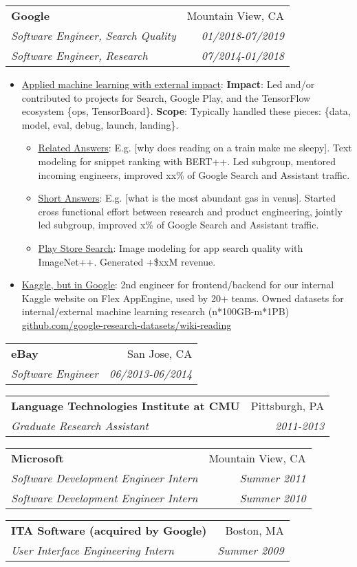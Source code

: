 \documentclass[letterpaper,9pt]{article}
\makeatletter
\newcommand{\resumeItem}[2]{
    \item\small{
        \underline{#1}{: #2 \vspace{-2pt}}
    }
}
\newcommand{\resumeSubheading}[4]{
    \vspace{-1pt}\item
    \begin{tabular*}{0.97\textwidth}[t]{l@{\extracolsep{\fill}}r}
        \textbf{#1} & #2 \\
        \textit{\small#3} & \textit{\small #4} \\
    \end{tabular*}\vspace{-5pt}
}
\newcommand{\resumeDoubleSubheading}[6]{
    \vspace{-1pt}\item
    \begin{tabular*}{0.97\textwidth}[t]{l@{\extracolsep{\fill}}r}
        \textbf{#1} & #2 \\
        \textit{\small#3} & \textit{\small #4} \\
        \textit{\small#5} & \textit{\small #6} \\
    \end{tabular*}\vspace{-5pt}
}
\newcommand{\resumeItemListStart}{\begin{itemize}}
\newcommand{\resumeItemListEnd}{\end{itemize}\vspace{-5pt}}
\makeatother
\begin{document}
    \resumeDoubleSubheading
      {Google}{Mountain View, CA}
      {Software Engineer, Search Quality}{01/2018-07/2019}
      {Software Engineer, Research}{07/2014-01/2018}
      \resumeItemListStart
        \resumeItem{Applied machine learning with external impact}
          {
              \newline \textbf{Impact}: Led and/or contributed to projects for Search, Google Play, and the TensorFlow ecosystem \{ops, TensorBoard\}.
              \newline \textbf{Scope}: Typically handled these pieces: \{data, model, eval, debug, launch, landing\}.
          }
          \resumeItemListStart
            \resumeItem{Related Answers}{E.g. [why does reading on a train make me sleepy]. Text modeling for snippet ranking with BERT++. Led subgroup, mentored incoming engineers, improved xx\% of Google Search and Assistant traffic.}
            \resumeItem{Short Answers}{E.g. [what is the most abundant gas in venus]. Started cross functional effort between research and product engineering, jointly led subgroup, improved x\% of Google Search and Assistant traffic.}
            \resumeItem{Play Store Search}{Image modeling for app search quality with ImageNet++. Generated +\$xxM revenue.}
          \resumeItemListEnd
          \vspace{4pt}
        \resumeItem{Kaggle, but in Google}
          {
              \newline 2nd engineer for frontend/backend for our internal Kaggle website on Flex AppEngine, used by 20+ teams.
              \newline Owned datasets for internal/external machine learning research (n*100GB-m*1PB)
              \href{https://github.com/google-research-datasets/wiki-reading}{github.com/google-research-datasets/wiki-reading}
          }
      \resumeItemListEnd

    \resumeSubheading
      {eBay}{San Jose, CA}
      {Software Engineer}{06/2013-06/2014}
      
    \resumeSubheading
      {Language Technologies Institute at CMU}{Pittsburgh, PA}
      {Graduate Research Assistant}{2011-2013}
      
    \resumeDoubleSubheading
      {Microsoft}{Mountain View, CA}
      {Software Development Engineer Intern}{Summer 2011}
      {Software Development Engineer Intern}{Summer 2010}
      
    \resumeSubheading
      {ITA Software (acquired by Google)}{Boston, MA}
      {User Interface Engineering Intern}{Summer 2009}
      
\end{document}
